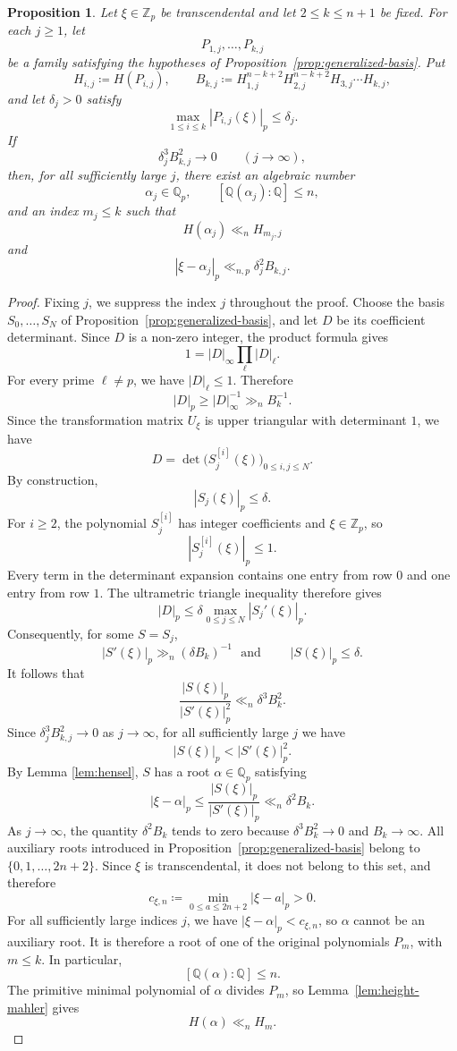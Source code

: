 \documentclass[12pt,reqno]{amsart}
\newtheorem{proposition}[theorem]{Proposition}
\theoremstyle{definition}
\theoremstyle{remark}
\newcommand{\Q}{\mathbb Q}
\newcommand{\Qp}{\mathbb Q_p}
\newcommand{\Zp}{\mathbb Z_p}
\begin{document}
\begin{proposition}\label{prop:local-resultant}
Let $\xi\in\Zp$ be transcendental and let $2\leq k\leq n+1$ be fixed. For
each $j\geq1$, let
$$
P_{1,j},\ldots,P_{k,j}
$$
be a family satisfying the hypotheses of
Proposition~\ref{prop:generalized-basis}. Put
$$
H_{i,j}\coloneqq H(P_{i,j}),
\qquad
B_{k,j}\coloneqq
H_{1,j}^{n-k+2}H_{2,j}^{n-k+2}H_{3,j}\cdots H_{k,j},
$$
and let $\delta_j>0$ satisfy
$$
\max_{1\leq i\leq k}|P_{i,j}(\xi)|_p\leq\delta_j.
$$
If
$$
\delta_j^3B_{k,j}^2\longrightarrow0
\qquad(j\to\infty),
$$
then, for all sufficiently large $j$, there exist an algebraic number
$$
\alpha_j\in\Qp,
\qquad [\Q(\alpha_j):\Q]\leq n,
$$
and an index $m_j\leq k$ such that
$$
H(\alpha_j)\ll_n H_{m_j,j}
$$
and
$$
|\xi-\alpha_j|_p\ll_{n,p}\delta_j^2B_{k,j}.
$$
\end{proposition}

\begin{proof}
Fixing $j$, we suppress the index $j$ throughout the proof.
Choose the basis $S_0,\ldots,S_N$ of Proposition~\ref{prop:generalized-basis}, and let $D$ be its coefficient determinant. Since $D$ is a non-zero integer, the product formula gives
$$
1=|D|_\infty\prod_\ell|D|_\ell.
$$
For every prime $\ell\neq p$, we have $|D|_\ell\leq1$. Therefore
$$
|D|_p\geq|D|_\infty^{-1}\gg_n B_k^{-1}.
$$
Since the transformation matrix $U_\xi$ is upper triangular with determinant
$1$, we have
$$
D=\det\bigl(S_j^{[i]}(\xi)\bigr)_{0\leq i,j\leq N}.
$$
By construction,
$$
|S_j(\xi)|_p\leq\delta.
$$
For $i\geq2$, the polynomial $S_j^{[i]}$ has integer coefficients and $\xi\in\Zp$, so
$$
|S_j^{[i]}(\xi)|_p\leq1.
$$
Every term in the determinant expansion contains one entry from row $0$ and one entry from row $1$. The ultrametric triangle inequality therefore gives
$$
|D|_p
\leq
\delta\max_{0\leq j\leq N}|S_j'(\xi)|_p.
$$
Consequently, for some $S=S_j$,
$$
|S'(\xi)|_p\gg_n(\delta B_k)^{-1}\,\,\,\, \text{and}\,\,
\qquad |S(\xi)|_p\leq\delta.
$$
It follows that
$$
\frac{|S(\xi)|_p}{|S'(\xi)|_p^2}
\ll_n \delta^3B_k^2.
$$
Since $\delta_j^3B_{k,j}^2\to0$ as $j\to\infty$, for all sufficiently large
$j$ we have
$$
|S(\xi)|_p<|S'(\xi)|_p^2.
$$
By Lemma \ref{lem:hensel}, $S$ has a root $\alpha\in\Qp$ satisfying
$$
|\xi-\alpha|_p
\leq\frac{|S(\xi)|_p}{|S'(\xi)|_p}
\ll_n\delta^2B_k.
$$
As $j\to\infty$, the quantity $\delta^2B_k$ tends to zero because  $\delta^3B_k^2\longrightarrow0$ and $B_k\longrightarrow \infty$.
All auxiliary roots introduced in Proposition~\ref{prop:generalized-basis}
belong to $\{0,1,\ldots,2n+2\}$. Since $\xi$ is transcendental, it does not
belong to this set, and therefore
$$
c_{\xi,n}
\coloneqq
\min_{0\leq a\leq2n+2}|\xi-a|_p
>0.
$$
For all sufficiently large indices $j$, we have
$|\xi-\alpha|_p<c_{\xi,n}$, so $\alpha$ cannot be an auxiliary root. It is
therefore a root of one of the original polynomials $P_m$, with $m\leq k$.
In particular,
$$
[\Q(\alpha):\Q]\leq n.
$$
The primitive minimal polynomial of $\alpha$ divides $P_m$, so Lemma~\ref{lem:height-mahler} gives
$$
H(\alpha)\ll_nH_m.
$$
\end{proof}
\end{document}
